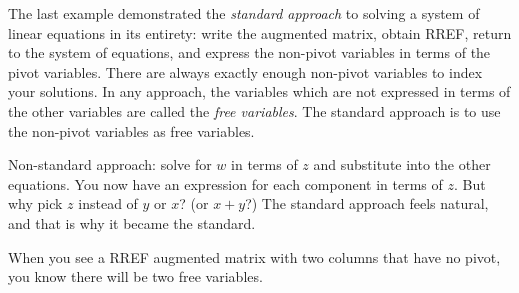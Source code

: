 The last example demonstrated the \hypertarget{standard approach}{{\itshape standard approach}} to solving a system of linear equations in its entirety: write the augmented matrix, obtain RREF, return to the system of equations, and express the non-pivot variables in terms of the pivot variables. 
There are always exactly enough non-pivot variables to index your solutions. 
In any approach, the variables which are not expressed in terms of the other variables are called the {\itshape free variables}. The standard approach is to use the non-pivot variables as free variables.

Non-standard approach: solve for $w$ in terms of $z$ and substitute into the other equations. You now have an expression for each component in terms of $z$. But why pick $z$ instead of $y$ or $x$? (or $x+y$?) The standard approach feels natural, and that is why it became the standard.

When you see a RREF augmented matrix with two columns that have no pivot, you know there will be two free variables. 

